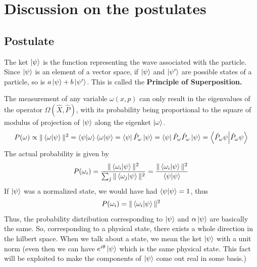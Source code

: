 \documentclass[12pt,a4paper]{report}
\newcommand{\rom}[1]{\Romannum{#1}}
\begin{document}
\section{Discussion on the postulates}

\subsection{Postulate \rom{1}}

The ket $\ket{\psi}$ is the function representing the wave associated with the particle. Since $\ket{\psi}$ is an
element of a vector space, if $\ket{\psi}$ and $\ket{\psi'}$ are possible states of a particle, so is $a\ket{\psi} + b\ket{\psi'}$.
This is called the \textbf{Principle of Superposition.}

The measurement of any variable $\omega(x, p)$ can only result in the eigenvalues of the operator $\hat{\Omega}(\hat{X}, \hat{P})$,
with its probability being proportional to the square of modulus of projection of $\ket{\psi}$ along the eigenket $\ket{\omega}$.
\begin{equation*}
    P(\omega) \propto \| \bra{\omega}\ket{\psi} \|^2 = \bra{\psi}\ket{\omega}\bra{\omega}\ket{\psi} = \bra{\psi}\hat{P}_\omega\ket{\psi} = \bra{\psi}\hat{P}_\omega\hat{P}_\omega\ket{\psi} = \bra{\hat{P}_\omega\psi}\ket{\hat{P}_\omega\psi}
\end{equation*}
The actual probability is given by
\begin{equation*}
    P(\omega_i) = \frac{\| \bra{\omega_i}\ket{\psi} \|^2}{\sum_{j}\| \bra{\omega_j}\ket{\psi} \|^2} = \frac{\| \bra{\omega_i}\ket{\psi} \|^2}{\bra{\psi}\ket{\psi}}
\end{equation*}
If $\ket{\psi}$ was a normalized state, we would have had $\bra{\psi}\ket{\psi} = 1$, thus
\begin{equation*}
    P(\omega_i) = \| \bra{\omega_i}\ket{\psi} \|^2
\end{equation*}
Thus, the probability distribution corresponding to $\ket{\psi}$ and $\alpha\ket{\psi}$ are basically the same. So, corresponding to a physical state, there exists a
whole direction in the hilbert space. When we talk about a state, we mean the ket $\ket{\psi}$ with a unit norm (even then we can have $e^{i\theta}\ket{\psi}$ which is
the same physical state. This fact will be exploited to make the components of $\ket{\psi}$ come out real in some basis.)
\end{document}
